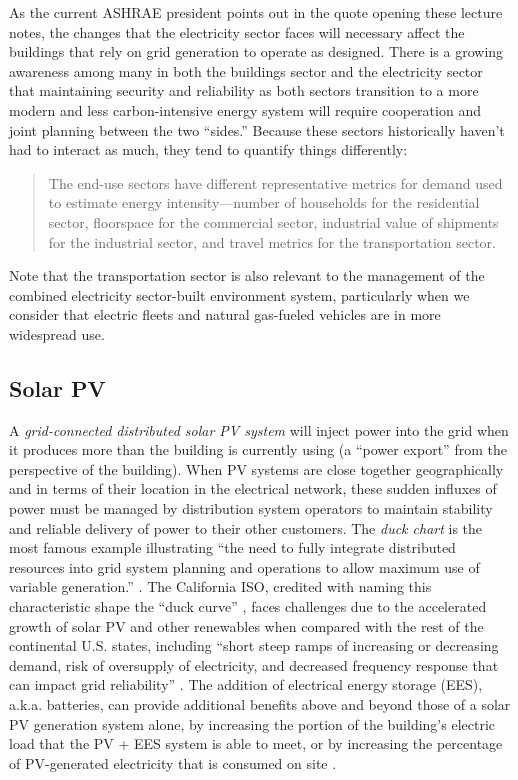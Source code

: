 \documentclass[10pt]{article}
\begin{document}
As the current ASHRAE president points out in the quote opening these lecture notes, the changes that the electricity sector faces will necessary affect the buildings that rely on grid generation to operate as designed. There is a growing awareness among many in both the buildings sector and the electricity sector that maintaining security and reliability as both sectors transition to a more modern and less carbon-intensive energy system will require cooperation and joint planning between the two ``sides.'' Because these sectors historically haven't had to interact as much, they tend to quantify things differently: 

\begin{quote}
The end-use sectors have different representative metrics for demand used to estimate energy
intensity---number of households for the residential sector, floorspace for the commercial sector, industrial
value of shipments for the industrial sector, and travel metrics for the transportation sector. 
\cite{aeo2019}
\end{quote}

Note that the transportation sector is also relevant to the management of the combined electricity sector-built environment system, particularly when we consider that electric fleets and natural gas-fueled vehicles are in more widespread use.

\subsection{Solar PV}

A \textit{grid-connected distributed solar PV system} will inject power into the grid when it produces more than the building is currently using (a ``power export'' from the perspective of the building). When PV systems are close together geographically and in terms of their location in the electrical network, these sudden influxes of power must be managed by distribution system operators to maintain stability and reliable delivery of power to their other customers. The \textit{duck chart}  is the most famous example illustrating ``the need to fully integrate distributed resources into grid system planning and operations to allow maximum use of variable generation.'' \cite{noauthor_undated-wm}. The California ISO, credited with naming this characteristic shape the ``duck curve'' \cite{noauthor_undated-wm}, faces challenges due to the accelerated growth of solar PV and other renewables when compared with the rest of the continental U.S. states, including ``short
steep ramps of increasing or decreasing demand, risk
of oversupply of electricity, and decreased frequency
response that can impact grid reliability'' \cite{newenergyfuture}. The addition of electrical energy storage (EES), a.k.a. batteries, can provide additional benefits above and beyond those of a solar PV generation system alone, by increasing the portion of the building's electric load that the PV + EES system is able to meet, or by increasing the percentage of PV-generated electricity that is consumed on site \cite{OShaughnessy2018-gu}. 
\end{document}
